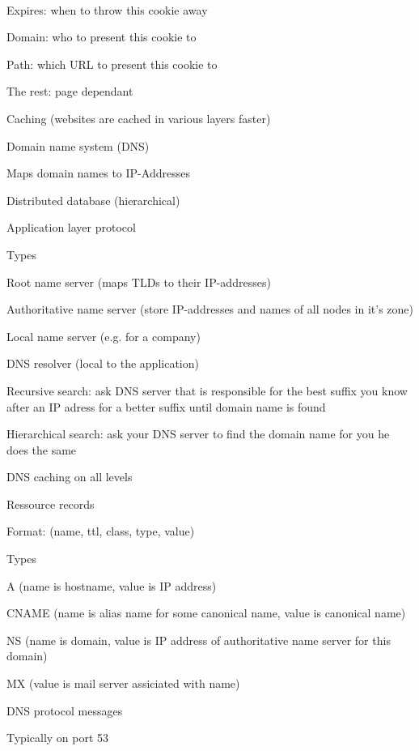 		\\ 
		\item Expires: when to throw this cookie away
		\item Domain: who to present this cookie to
		\item Path: which URL to present this cookie to
		\item The rest: page dependant
	\enumend
	\item Caching (websites are cached in various layers \arrow faster)
	\item Domain name system (DNS)
	\enumstart
		\item Maps domain names to IP-Addresses
		\item Distributed database (hierarchical)
		\item Application layer protocol
		\item Types
		\enumstart
			\item Root name server (maps TLDs to their IP-addresses)
			\item Authoritative name server (store IP-addresses and names of all nodes in it's zone)
			\item Local name server (e.g. for a company)
			\item DNS resolver (local to the application)
		\enumend
		\item Recursive search: ask DNS server that is responsible for the best suffix you know after an IP adress for a better suffix \arrow until domain name is found
		\item Hierarchical search: ask your DNS server to find the domain name for you \arrow he does the same
		\item DNS caching \arrow on all levels
		\item Ressource records
		\enumstart
			\item Format: (name, ttl, class, type, value)
			\item Types
			\enumstart
				\item A (name is hostname, value is IP address)
				\item CNAME (name is alias name for some canonical name, value is canonical name)
				\item NS (name is domain, value is IP address of authoritative name server for this domain)
				\item MX (value is mail server assiciated with name)
			\enumend
		\enumend
		\item DNS protocol messages
		\enumstart
			\item Typically on port 53
